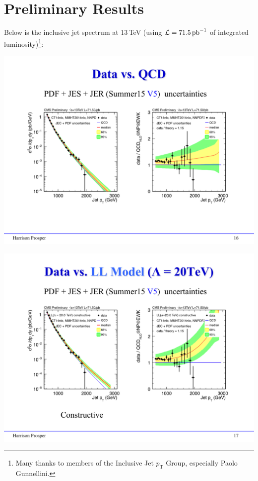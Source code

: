 \documentclass[t,professionalfonts,handout, xcolor=pdftex,dvipsnames,table]{beamer}
\begin{document}
\section{Preliminary Results}
\begin{frame}
Below is the inclusive jet spectrum at 13\,TeV (using ${\cal L} = 71.5\,\textrm{pb}^{-1}$ of
integrated luminosity)\footnote{Many thanks to members of the Inclusive Jet $p_\textrm{T}$ Group, especially
Paolo Gunnellini.}:
\centerline{
\includegraphics[width=\textwidth]{fig_data_QCD.pdf}
}
\end{frame}

\begin{frame}
\centerline{
\includegraphics[width=\textwidth]{fig_data_LL.pdf}
}
\end{frame}
\end{document}
